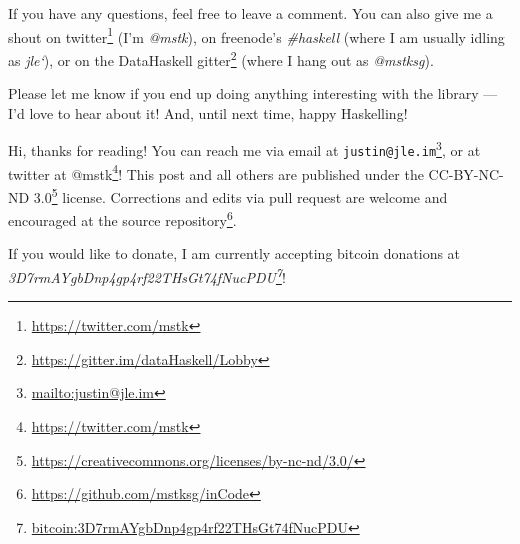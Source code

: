 \documentclass[]{article}
\renewcommand{\href}[2]{#2\footnote{\url{#1}}}
\begin{document}
If you have any questions, feel free to leave a comment. You can also give me a
shout on \href{https://twitter.com/mstk}{twitter} (I'm \emph{@mstk}), on
freenode's \emph{\#haskell} (where I am usually idling as \emph{jle`}), or on
the \href{https://gitter.im/dataHaskell/Lobby}{DataHaskell gitter} (where I hang
out as \emph{@mstksg}).

Please let me know if you end up doing anything interesting with the library ---
I'd love to hear about it! And, until next time, happy Haskelling!

Hi, thanks for reading! You can reach me via email at
\href{mailto:justin@jle.im}{\nolinkurl{justin@jle.im}}, or at twitter at
\href{https://twitter.com/mstk}{@mstk}! This post and all others are published
under the \href{https://creativecommons.org/licenses/by-nc-nd/3.0/}{CC-BY-NC-ND
3.0} license. Corrections and edits via pull request are welcome and encouraged
at \href{https://github.com/mstksg/inCode}{the source repository}.

If you would like to donate, I am currently accepting bitcoin donations at
\emph{\href{bitcoin:3D7rmAYgbDnp4gp4rf22THsGt74fNucPDU}{3D7rmAYgbDnp4gp4rf22THsGt74fNucPDU}}!
\end{document}
